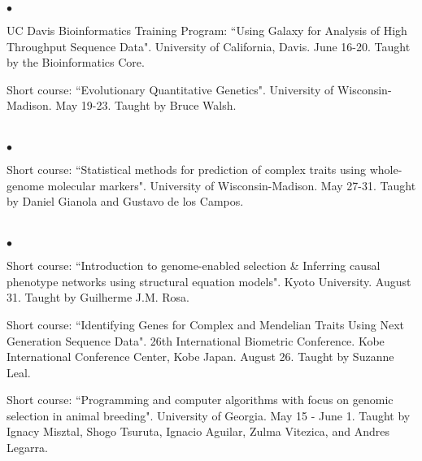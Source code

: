 \documentclass[margin,line,10pt]{res}
\newenvironment{list2}{
  \begin{list}{$\bullet$}{%
      \setlength{\itemsep}{0in}
      \setlength{\parsep}{0in} \setlength{\parskip}{0in}
      \setlength{\topsep}{0in} \setlength{\partopsep}{0in} 
      \setlength{\leftmargin}{0.2in}}}{\end{list}}
\begin{document}
\begin{resume}
\begin{list2}
\vspace{0.5cm}

\item UC Davis Bioinformatics Training Program: 
``Using Galaxy for Analysis of High Throughput Sequence Data". University of California, Davis. June 16-20. 
Taught by the Bioinformatics Core. 

\vspace{0.5cm}

\item Short course: ``Evolutionary Quantitative Genetics". University of Wisconsin-Madison. May 19-23. 
Taught by Bruce Walsh. 

\end{list2}

\section{}
\begin{list2}
\item Short course: ``Statistical methods for prediction of complex traits using whole-genome molecular markers". University of Wisconsin-Madison. May 27-31. 
Taught by Daniel Gianola and Gustavo de los Campos.
\end{list2}  

\section{}
\begin{list2}
\item Short course: ``Introduction to genome-enabled selection \& Inferring causal phenotype networks using structural equation models". 
Kyoto University. August 31. Taught by Guilherme J.M. Rosa. 

\vspace{0.5cm}

\item Short course: ``Identifying Genes for Complex and Mendelian Traits Using Next Generation Sequence Data". 26th International Biometric Conference. Kobe International Conference Center, Kobe Japan. August 26. Taught by Suzanne Leal.  

\vspace{0.5cm}

\item Short course: ``Programming and computer algorithms with focus on genomic selection in animal breeding".  University of Georgia. May 15 - June 1.  
Taught by Ignacy Misztal, Shogo Tsuruta, Ignacio Aguilar, Zulma Vitezica, and  Andres Legarra. 
\end{list2}  


\end{resume}
\end{document}
